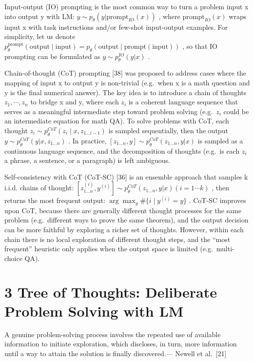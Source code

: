 \documentclass[
]{article}
\begin{document}
Input-output (IO) prompting is the most common way to turn a problem
input x into output y with LM:
\(y \sim p_{\theta}(y|\text{prompt}_{IO}(x))\) , where
\(\text{prompt}_{IO}(x)\) wraps input x with task instructions and/or
few-shot input-output examples. For simplicity, let us denote
\(p_{\theta}^{\text{prompt}}(\text{output} \mid \text{input}) = p_{\theta}(\text{output} \mid \text{prompt}(\text{input}))\)
, so that IO prompting can be formulated as
\(y \sim p_{\theta}^{IO}(y|x)\) .

Chain-of-thought (CoT) prompting {[}38{]} was proposed to address cases
where the mapping of input x to output y is non-trivial (e.g.~when x is
a math question and y is the final numerical answer). The key idea is to
introduce a chain of thoughts \(z_{1}, \cdots, z_{n}\) to bridge x and
y, where each \(z_{i}\) is a coherent language sequence that serves as a
meaningful intermediate step toward problem solving (e.g.~\(z_{i}\)
could be an intermediate equation for math QA). To solve problems with
CoT, each thought
\(z_{i} \sim p_{\theta}^{CoT}(z_{i} \mid x, z_{1 \ldots i-1})\) is
sampled sequentially, then the output
\(y \sim p_{\theta}^{CoT}(y|x, z_{1 \ldots n})\) . In practice,
\([z_{1 \ldots n}, y] \sim p_{\theta}^{CoT}(z_{1 \ldots n}, y|x)\) is
sampled as a continuous language sequence, and the decomposition of
thoughts (e.g.~is each \(z_{i}\) a phrase, a sentence, or a paragraph)
is left ambiguous.

Self-consistency with CoT (CoT-SC) {[}36{]} is an ensemble approach that
samples k i.i.d. chains of thought:
\([z_{1\ldots n}^{(i)}, y^{(i)}] \sim p_{\theta}^{CoT}(z_{1\ldots n}, y|x) (i = 1 \cdots k)\)
, then returns the most frequent output:
\(\arg\max_{y} \#\{i \mid y^{(i)} = y\}\) . CoT-SC improves upon CoT,
because there are generally different thought processes for the same
problem (e.g.~different ways to prove the same theorem), and the output
decision can be more faithful by exploring a richer set of thoughts.
However, within each chain there is no local exploration of different
thought steps, and the ``most frequent'' heuristic only applies when the
output space is limited (e.g.~multi-choice QA).

\section{3 Tree of Thoughts: Deliberate Problem Solving with
LM}\label{tree-of-thoughts-deliberate-problem-solving-with-lm}

A genuine problem-solving process involves the repeated use of available
information to initiate exploration, which discloses, in turn, more
information until a way to attain the solution is finally discovered.---
Newell et al.~{[}21{]}
\end{document}
